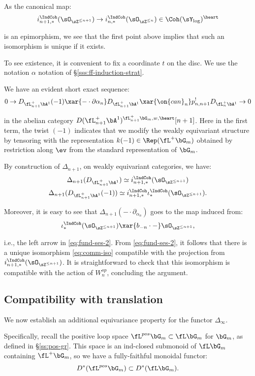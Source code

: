 As the canonical map:
%
\[
i_{n+1,*}^{\IndCoh}(\sO_{\sZ^{\leq n+1}}) \to
i_{n,*}^{\IndCoh}(\sO_{\sZ^{\leq n}}) \in \Coh(\sY_{\log})^{\heart}
\]

 is an epimorphism, we see that the first point above
implies that such an isomorphism is unique if it exists.

To see existence, it is convenient to fix a coordinate $t$ on the
disc. We use the
notation $\alpha$ notation of \S \ref{sss:ff-induction-strat}.

We have an evident short exact sequence:
%
\[
0 \to D_{\fL_{n+1}^+ \bA^1}(-1) \xar{-\cdot \partial\alpha_n}
D_{\fL_{n+1}^+ \bA^1} \xar{\on{can}_n}
p_{n,n+1}^! D_{\fL_n^+ \bA^1} \to 0
\]

 in the abelian category
$D(\fL_{n+1}^+\bA^1)^{\fL_{n+1}^+ \bG_m,w,\heart}[n+1]$.
Here in the first term, the twist $(-1)$ indicates that we modify the
weakly equivariant structure by tensoring with the representation
$k(-1) \in \Rep(\fL^+\bG_m)$ obtained by restriction along $\ev$ from the
standard representation of $\bG_m$.

By construction of $\Delta_{n+1}$, on weakly equivariant
categories, we have:
%
\[
\begin{gathered}
\Delta_{n+1}(D_{\fL_{n+1}^+ \bA^1}) \simeq i_{n+1,*}^{\IndCoh}(\sO_{\sZ^{\leq n+1}}) \\
\Delta_{n+1}(D_{\fL_{n+1}^+ \bA^1}(-1))
\simeq i_{n+1,*}^{\IndCoh}\iota_*^{\IndCoh}(\sO_{\sZ^{\leq n+1}}).
\end{gathered}
\]

 Moreover, it is easy to see that $\Delta_{n+1}(-\cdot \partial_{\alpha_n})$
goes to the map induced from:
%
\[
\iota_*^{\IndCoh}(\sO_{\sZ^{\leq n+1}}) \xar{b_{-n}\cdot-}
\sO_{\sZ^{\leq n+1}},
\]

 i.e., the left arrow in \eqref{eq:fund-ses-2}. From
\eqref{eq:fund-ses-2}, it follows that there is a unique
isomorphism \eqref{eq:comm-iso} compatible with the projection from
$i_{n+1,*}^{\IndCoh}(\sO_{\sZ^{\leq n+1}})$. It is straightforward
to check that this isomorphism is compatible with the action of
$W_n^{op}$, concluding the argument.

\subsection{Compatibility with translation}

We now establish an additional equivariance property
for the functor $\Delta_{\infty}$.

Specifically, recall the positive loop space $\fL^{pos} \bG_m \subset \fL \bG_m$
for $\bG_m$, as defined in \S \ref{ss:pos-gr}.
This space is an ind-closed submonoid of $\fL \bG_m$ containing
$\fL^+\bG_m$, so we have
a fully-faithful monoidal functor:
%
\[
D^*(\fL^{pos} \bG_m) \subset D^*(\fL \bG_m).
\]

